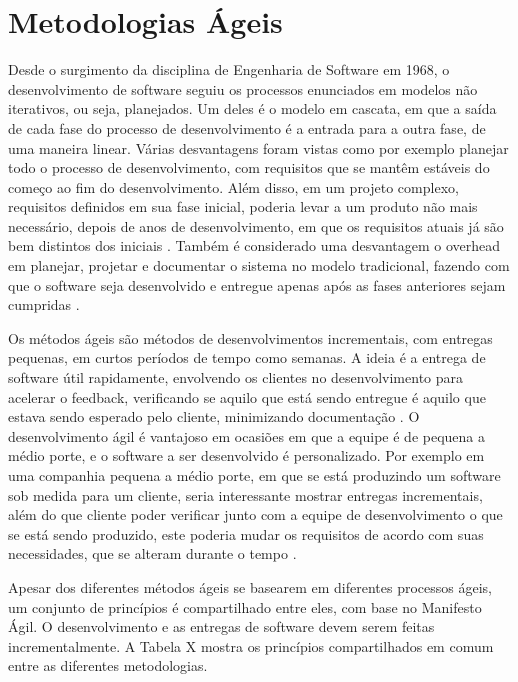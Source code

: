 \label{referencial}
\section{Metodologias Ágeis}



Desde o surgimento da disciplina de Engenharia de Software em 1968, o desenvolvimento de software seguiu os processos enunciados em modelos não iterativos, ou seja, planejados. Um deles é o modelo em cascata, em que a saída de cada fase do processo de desenvolvimento é a entrada para a outra fase, de uma maneira linear. Várias desvantagens foram vistas como por exemplo planejar todo o processo de desenvolvimento, com requisitos que se mantêm estáveis do começo ao fim do desenvolvimento. Além disso, em um projeto complexo, requisitos definidos em sua fase inicial, poderia levar a um produto não mais necessário, depois de anos de desenvolvimento, em que os requisitos atuais já são bem distintos dos iniciais \cite{sommerville2015software}. Também é considerado uma desvantagem o overhead em planejar, projetar e documentar o sistema no modelo tradicional, fazendo com que o software seja desenvolvido e entregue apenas após as fases anteriores sejam cumpridas \cite{sommerville2015software}.

Os métodos ágeis são métodos de desenvolvimentos incrementais, com entregas pequenas, em curtos períodos de tempo como semanas. A ideia é a entrega de software útil rapidamente, envolvendo os clientes no desenvolvimento para acelerar o feedback, verificando se aquilo que está sendo entregue é aquilo que estava sendo esperado pelo cliente, minimizando documentação \cite{sommerville2015software}.
O desenvolvimento ágil é vantajoso em ocasiões em que a equipe é de pequena a médio porte, e o software a ser desenvolvido é personalizado. Por exemplo em uma companhia pequena a médio porte, em que se está produzindo um software sob medida para um cliente, seria interessante mostrar entregas incrementais, além do que cliente poder verificar junto com a equipe de desenvolvimento o que se está sendo produzido, este poderia mudar os requisitos de acordo com suas necessidades, que se alteram durante o tempo \cite{sommerville2015software}.


Apesar dos diferentes métodos ágeis se basearem em diferentes processos ágeis, um conjunto de princípios é compartilhado entre eles, com base no Manifesto Ágil. O desenvolvimento e as entregas de software devem serem feitas incrementalmente. A Tabela X mostra os princípios compartilhados em comum entre as diferentes metodologias.

